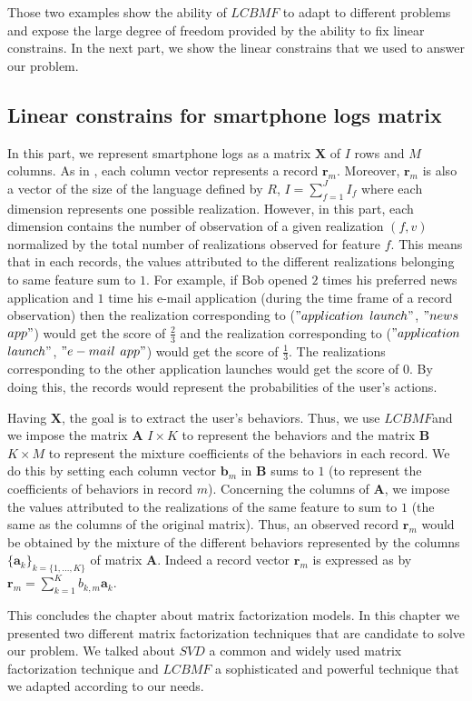 Those two examples show the ability of $LCBMF$ to adapt to different problems and expose the large degree of freedom provided by the ability to fix linear constrains. In the next part, we show the linear constrains that we used to answer our problem.

\subsection{Linear constrains for smartphone logs matrix}

In this part, we represent smartphone logs as a matrix $\boldsymbol{X}$ of $I$ rows and $M$ columns. As in \label{4.1.1}, each column vector represents a record $\mathbf{r}_{m}$. Moreover, $\mathbf{r}_{m}$ is also a vector of the size of the language defined by $R$, $I=\sum_{f=1}^{J}I_{f}$ where each dimension represents one possible realization. However, in this part, each dimension contains the number of observation of a given realization $(f,v)$ normalized by the total number of realizations observed for feature $f$. This means that in each records, the values attributed to the different realizations belonging to same feature sum to $1$. For example, if Bob opened $2$ times his preferred news application and $1$ time his e-mail application (during the time frame of a record observation) then the realization corresponding to ($"application$ $launch"$, $"news$ $app"$) would get the score of $\frac{2}{3}$ and the realization corresponding to ($"application$ $launch"$, $"e-mail$ $app"$) would get the score of $\frac{1}{3}$. The realizations corresponding to the other application launches would get the score of $0$. By doing this, the records would represent the probabilities of the user's actions. \par

Having $\boldsymbol{X}$, the goal is to extract the user's behaviors. Thus, we use $LCBMF$and we impose the matrix $\boldsymbol{A}$ $I \times K$ to represent the behaviors and the matrix $\boldsymbol{B}$ $K \times M$ to represent the mixture coefficients of the behaviors in each record. We do this by setting each column vector $\mathbf{b}_{m}$ in $\boldsymbol{B}$ sums to $1$ (to represent the coefficients of behaviors in record $m$). Concerning the columns of $\boldsymbol{A}$, we impose the values attributed to the realizations of the same feature to sum to $1$ (the same as the columns of the original matrix). Thus, an observed record $\mathbf{r}_{m}$ would be obtained by the mixture of the different behaviors represented by the columns $\{\mathbf{a}_{k}\}_{k=\{1,...,K\}}$ of matrix $\boldsymbol{A}$. Indeed a record vector $\mathbf{r}_m$ is expressed as by $\mathbf{r}_m = \sum_{k=1}^{K}b_{k,m}\mathbf{a}_{k}$. \par

This concludes the chapter about matrix factorization models. In this chapter we presented two different matrix factorization techniques that are candidate to solve our problem. We talked about $SVD$ a common and widely used matrix factorization technique and $LCBMF$ a sophisticated and powerful technique that we adapted according to our needs.